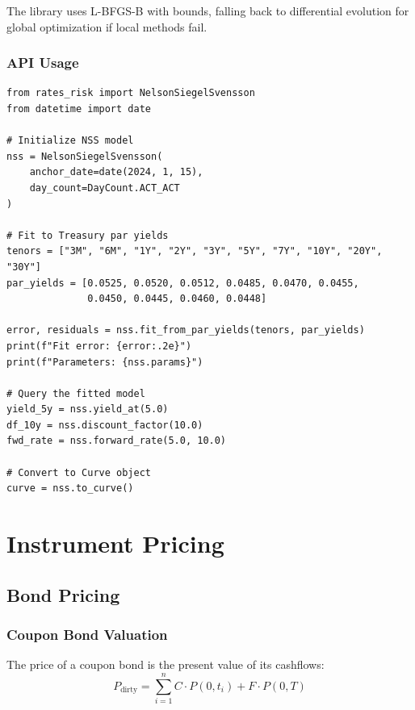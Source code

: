 \documentclass[12pt,a4paper]{report}
\begin{document}
The library uses L-BFGS-B with bounds, falling back to differential evolution for global optimization if local methods fail.

\subsection{API Usage}

\begin{lstlisting}
from rates_risk import NelsonSiegelSvensson
from datetime import date

# Initialize NSS model
nss = NelsonSiegelSvensson(
    anchor_date=date(2024, 1, 15),
    day_count=DayCount.ACT_ACT
)

# Fit to Treasury par yields
tenors = ["3M", "6M", "1Y", "2Y", "3Y", "5Y", "7Y", "10Y", "20Y", "30Y"]
par_yields = [0.0525, 0.0520, 0.0512, 0.0485, 0.0470, 0.0455, 
              0.0450, 0.0445, 0.0460, 0.0448]

error, residuals = nss.fit_from_par_yields(tenors, par_yields)
print(f"Fit error: {error:.2e}")
print(f"Parameters: {nss.params}")

# Query the fitted model
yield_5y = nss.yield_at(5.0)
df_10y = nss.discount_factor(10.0)
fwd_rate = nss.forward_rate(5.0, 10.0)

# Convert to Curve object
curve = nss.to_curve()
\end{lstlisting}

\chapter{Instrument Pricing}

\section{Bond Pricing}

\subsection{Coupon Bond Valuation}

The price of a coupon bond is the present value of its cashflows:
\begin{equation}
    P_{\text{dirty}} = \sum_{i=1}^{n} C \cdot P(0,t_i) + F \cdot P(0,T)
\end{equation}
\end{document}

